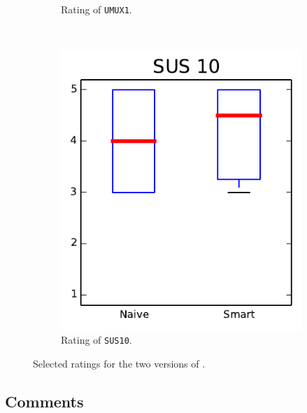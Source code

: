 \begin{figure}[h!]
\begin{subfigure}[t]{0.32\textwidth}
\caption{Rating of \texttt{UMUX1}.}
\end{subfigure}%
~
\begin{subfigure}[t]{0.32\textwidth}
\centering
\includegraphics[width=\textwidth]{img/graphs/4a_09.pdf}
\caption{Rating of \texttt{SUS10}.}
\end{subfigure}
\caption{Selected ratings for the two versions of \oframp.}
\end{figure}


\subsection{Comments}
\nlipsum
